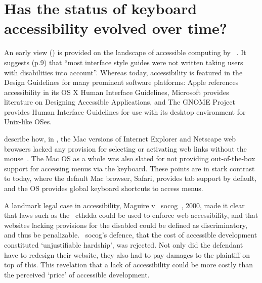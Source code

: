 \documentclass[a4paper, 12pt]{report}
\begin{document}
\section{Has the status of keyboard accessibility evolved over time?}
\label{a11yevolution}
An early view (\citeyear{bergman1995towards}) is provided on the landscape of accessible computing by \citeauthor{bergman1995towards}~\cite{bergman1995towards}. It suggests (p.9) that ``most interface style guides were not written taking users with disabilities into account''. Whereas today, accessibility is featured in the Design Guidelines for many prominent software platforms: Apple references accessibility in its OS X Human Interface Guidelines\cite{applehig}, Microsoft provides literature on Designing Accessible Applications\cite{microsofthig}, and The GNOME Project provides Human Interface Guidelines for use with its desktop environment for Unix-like OSes\cite{gnomehig}.

\citeauthor{hendrix1997adapting} describe how, in \citeyear{hendrix1997adapting}, the Mac versions of Internet Explorer and Netscape web browsers lacked any provision for selecting or activating web links without the mouse~\cite{hendrix1997adapting}. The Mac OS as a whole was also slated for not providing out-of-the-box support for accessing menus via the keyboard. These points are in stark contrast to today, where the default Mac browser, Safari, provides tab support by default\cite{safaria11y}, and the OS provides global keyboard shortcuts to access menus\cite{macshortcuts}.

A landmark legal case in accessibility, Maguire v ~\gls{socog}~\cite{sloan2001web,russell2003access}, 2000, made it clear that laws such as the ~\gls{cthdda} could be used to enforce web accessibility, and that websites lacking provisions for the disabled could be defined as discriminatory, and thus be penalizable. ~\gls{socog}'s defence, that the cost of accessible development constituted `unjustifiable hardship', was rejected. Not only did the defendant have to redesign their website, they also had to pay damages to the plaintiff on top of this. This revelation that a lack of accessibility could be more costly than the perceived `price' of accessible development.
\end{document}
